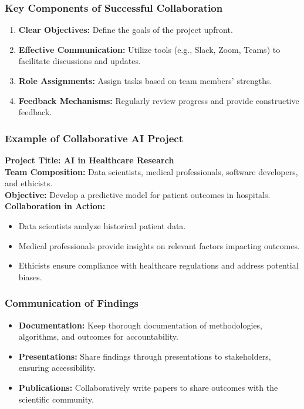 \documentclass[aspectratio=169]{beamer}
\begin{document}
\begin{frame}[fragile]
    \frametitle{Key Components of Successful Collaboration}
    \begin{enumerate}
        \item \textbf{Clear Objectives:} Define the goals of the project upfront.
        \item \textbf{Effective Communication:} Utilize tools (e.g., Slack, Zoom, Teams) to facilitate discussions and updates.
        \item \textbf{Role Assignments:} Assign tasks based on team members’ strengths.
        \item \textbf{Feedback Mechanisms:} Regularly review progress and provide constructive feedback.
    \end{enumerate}
\end{frame}

\begin{frame}[fragile]
    \frametitle{Example of Collaborative AI Project}
    \textbf{Project Title: AI in Healthcare Research} \\
    \textbf{Team Composition:} Data scientists, medical professionals, software developers, and ethicists. \\
    \textbf{Objective:} Develop a predictive model for patient outcomes in hospitals. \\
    \textbf{Collaboration in Action:}
    \begin{itemize}
        \item Data scientists analyze historical patient data.
        \item Medical professionals provide insights on relevant factors impacting outcomes.
        \item Ethicists ensure compliance with healthcare regulations and address potential biases.
    \end{itemize}
\end{frame}

\begin{frame}[fragile]
    \frametitle{Communication of Findings}
    \begin{itemize}
        \item \textbf{Documentation:} Keep thorough documentation of methodologies, algorithms, and outcomes for accountability.
        \item \textbf{Presentations:} Share findings through presentations to stakeholders, ensuring accessibility.
        \item \textbf{Publications:} Collaboratively write papers to share outcomes with the scientific community.
    \end{itemize}
\end{frame}
\end{document}
